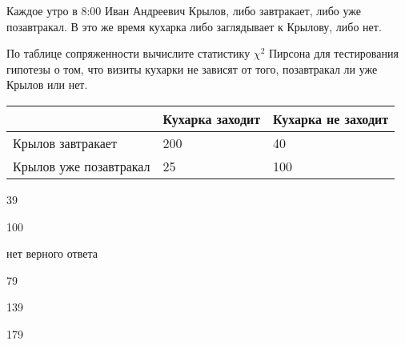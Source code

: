 
\begin{question}
Каждое утро в 8:00 Иван Андреевич Крылов, либо завтракает, либо уже
позавтракал. В это же время кухарка либо заглядывает к Крылову, либо
нет.

По таблице сопряженности вычислите статистику \(\chi^2\) Пирсона для
тестирования гипотезы о том, что визиты кухарки не зависят от того,
позавтракал ли уже Крылов или нет.

\begin{longtable}[]{@{}lll@{}}
\toprule
& Кухарка заходит & Кухарка не заходит \\
\midrule
\endhead
Крылов завтракает & 200 & 40 \\
Крылов уже позавтракал & 25 & 100 \\
\bottomrule
\end{longtable}
\begin{answerlist}
  \item 39
  \item 100
  \item нет верного ответа
  \item 79
  \item 139
  \item 179
\end{answerlist}
\end{question}


